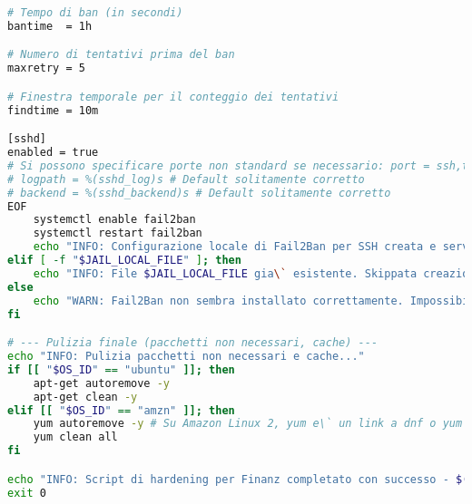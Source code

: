 \begin{lstlisting}[language=Bash, style=bash, caption={Script di Hardening del Sistema Operativo (hardening\_script.sh)}, label={lst:hardening_script_cap2}]
# Tempo di ban (in secondi)
bantime  = 1h

# Numero di tentativi prima del ban
maxretry = 5

# Finestra temporale per il conteggio dei tentativi
findtime = 10m

[sshd]
enabled = true
# Si possono specificare porte non standard se necessario: port = ssh,tuaporta
# logpath = %(sshd_log)s # Default solitamente corretto
# backend = %(sshd_backend)s # Default solitamente corretto
EOF
    systemctl enable fail2ban
    systemctl restart fail2ban
    echo "INFO: Configurazione locale di Fail2Ban per SSH creata e servizio riavviato."
elif [ -f "$JAIL_LOCAL_FILE" ]; then
    echo "INFO: File $JAIL_LOCAL_FILE gia\` esistente. Skippata creazione jail.local per Fail2Ban."
else
    echo "WARN: Fail2Ban non sembra installato correttamente. Impossibile configurare jail.local."
fi

# --- Pulizia finale (pacchetti non necessari, cache) ---
echo "INFO: Pulizia pacchetti non necessari e cache..."
if [[ "$OS_ID" == "ubuntu" ]]; then
    apt-get autoremove -y
    apt-get clean -y
elif [[ "$OS_ID" == "amzn" ]]; then
    yum autoremove -y # Su Amazon Linux 2, yum e\` un link a dnf o yum stesso
    yum clean all
fi

echo "INFO: Script di hardening per Finanz completato con successo - $(date)"
exit 0
    \end{lstlisting}

